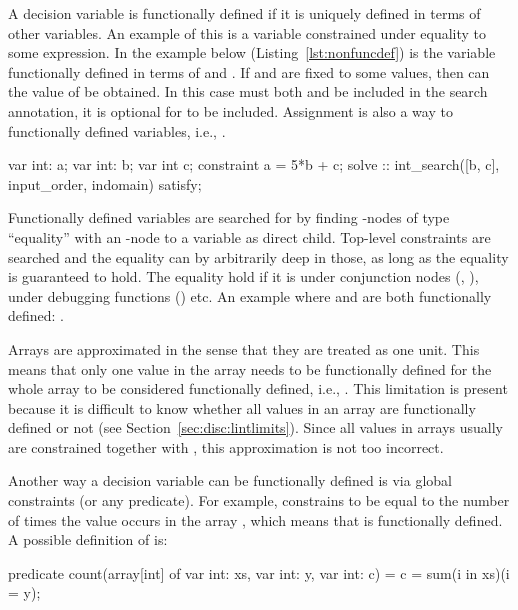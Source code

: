 \documentclass[a4paper,12pt]{article}
\begin{document}
A decision variable is functionally defined if it is uniquely defined in terms of other
variables. An example of this is a variable constrained under equality to some expression.
In the example below (Listing~\ref{lst:nonfuncdef}) is the variable  functionally defined in terms of  and .
If  and  are fixed to some values, then can the value of  be obtained. In this
case must both  and  be included in the search annotation, it is optional for
 to be included.
Assignment is also a way to functionally defined variables, i.e., .
\begin{mznnobreak}[label=lst:nonfuncdef,caption={\null}]
var int: a; var int: b; var int c;
constraint a = 5*b + c;
solve
  :: int_search([b, c], input_order, indomain)
  satisfy;
\end{mznnobreak}

Functionally defined variables are searched for by finding -nodes of type
``equality'' with an -node to a variable as direct child. Top-level constraints
are searched and the equality can by arbitrarily deep in those, as long as the equality is
guaranteed to hold. The equality hold if it is under conjunction nodes (\mi{/\\},
), under debugging functions () etc. An example where  and
 are both functionally defined: .

Arrays are approximated in the sense that they are treated as one unit. This means that
only one value in the array needs to be functionally defined for the whole array to be
considered functionally defined, i.e., . This limitation is present because
it is difficult to know whether all values in an array are functionally defined or not
(see Section~\ref{sec:disc:lintlimits}). Since all values in arrays usually are
constrained together with , this approximation is not too incorrect.

Another way a decision variable can be functionally defined is via global constraints (or
any predicate). For example,  constrains  to be equal to the
number of times the value  occurs in the array , which means that  is
functionally defined. A possible definition of  is:
\begin{mznnobreak}[label=lst:count,caption={\null}]
predicate count(array[int] of var int: xs,
                var int: y, var int: c) =
  c = sum(i in xs)(i = y);
\end{mznnobreak}
\end{document}
